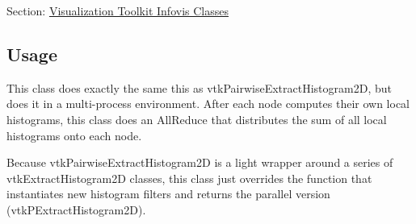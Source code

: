 Section\-: \hyperlink{sec_vtkinfovis}{Visualization Toolkit Infovis Classes} \hypertarget{vtkwidgets_vtkxyplotwidget_Usage}{}\subsection{Usage}\label{vtkwidgets_vtkxyplotwidget_Usage}
This class does exactly the same this as vtk\-Pairwise\-Extract\-Histogram2\-D, but does it in a multi-\/process environment. After each node computes their own local histograms, this class does an All\-Reduce that distributes the sum of all local histograms onto each node.

Because vtk\-Pairwise\-Extract\-Histogram2\-D is a light wrapper around a series of vtk\-Extract\-Histogram2\-D classes, this class just overrides the function that instantiates new histogram filters and returns the parallel version (vtk\-P\-Extract\-Histogram2\-D).

